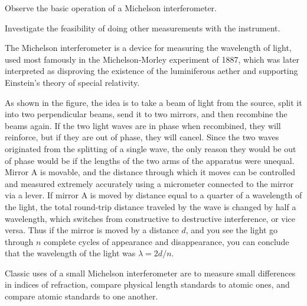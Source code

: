\label{lab:michelson}

\apparatus
{}

\begin{goals}

\item[] Observe the basic operation of a Michelson interferometer.

\item[] Investigate the feasibility of doing other measurements with the instrument.

\end{goals}

\introduction

The Michelson interferometer is a device for measuring the wavelength of
light, used most famously in the Michelson-Morley experiment of 1887,
which was later interpreted as disproving the existence of the luminiferous
aether and supporting Einstein's theory of special relativity.


As shown in the figure, the idea is to take a beam of light from the source,
split it into two perpendicular beams, send it to two mirrors, and then recombine
the beams again. If the two light waves are in phase when recombined, they will
reinforce, but if they are out of phase, they will cancel. Since the two waves
originated from the splitting of a single wave, the only reason they would be out
of phase would be if the lengths of the two arms of the apparatus were unequal. Mirror
A is movable, and the distance through which it moves can be controlled and measured
extremely accurately using a micrometer connected to the mirror via a lever.
If mirror A is moved by distance equal to a quarter of a wavelength of the light,
the total round-trip distance traveled by the wave is changed by half a wavelength,
which switches from constructive to destructive interference, or vice versa.
Thus if the mirror is moved by a distance $d$, and you see the light go through
$n$ complete cycles of appearance and disappearance, you can conclude that the
wavelength of the light was $\lambda=2d/n$.

Classic uses of a small Michelson interferometer are to measure small differences
in indices of refraction, compare physical length standards to atomic ones,
and compare atomic standards to one another.

